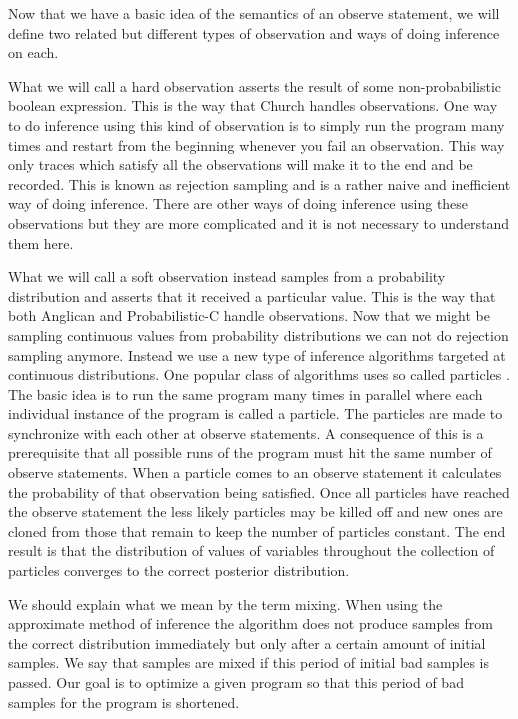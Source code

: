 \documentclass[a4paper]{article}
\begin{document}
Now that we have a basic idea of the semantics of an observe statement, we will define two related but different types of observation and ways of doing inference on each.

What we will call a hard observation asserts the result of some non-probabilistic boolean expression. This is the way that Church handles observations. One way to do inference using this kind of observation is to simply run the program many times and restart from the beginning whenever you fail an observation. This way only traces which satisfy all the observations will make it to the end and be recorded. This is known as rejection sampling and is a rather naive and inefficient way of doing inference. There are other ways of doing inference using these observations but they are more complicated and it is not necessary to understand them here.

What we will call a soft observation instead samples from a probability distribution and asserts that it received a particular value. This is the way that both Anglican and Probabilistic-C handle observations. Now that we might be sampling continuous values from probability distributions we can not do rejection sampling anymore. Instead we use a new type of inference algorithms targeted at continuous distributions. One popular class of algorithms uses so called particles \cite{MonteCarlo}. The basic idea is to run the same program many times in parallel where each individual instance of the program is called a particle. The particles are made to synchronize with each other at observe statements. A consequence of this is a prerequisite that all possible runs of the program must hit the same number of observe statements. When a particle comes to an observe statement it calculates the probability of that observation being satisfied. Once all particles have reached the observe statement the less likely particles may be killed off and new ones are cloned from those that remain to keep the number of particles constant. The end result is that the distribution of values of variables throughout the collection of particles converges to the correct posterior distribution.

We should explain what we mean by the term mixing. When using the approximate method of inference the algorithm does not produce samples from the correct distribution immediately but only after a certain amount of initial samples. We say that samples are mixed if this period of initial bad samples is passed. Our goal is to optimize a given program so that this period of bad samples for the program is shortened.
\end{document}
